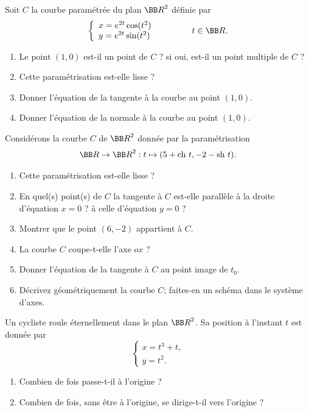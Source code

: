\documentclass[12pt,french,oneside,a4paper]{memoir} %
\begin{document}
\begin{exo}
Soit $C$ la courbe paramétrée du plan ${\BB R}^2$ définie par
\begin{equation*}
\left\{
\begin{array}{l}
x=e^{2t} \cos (t^2) \\
y = e^{2t} \sin (t^2)
\end{array}
\right.
\qquad \qquad t \in {\BB R}.
\end{equation*}
\begin{enumerate}
\item Le point $(1,0)$ est-il un point de $C$ ? si oui, est-il un point
multiple de $C$ ? 
\item Cette paramétrisation est-elle lisse ?
\item Donner l'équation de la tangente à la courbe au point $(1,0)$. 
\item Donner l'équation de la normale à la courbe au point $(1,0)$.
\end{enumerate}
\end{exo}
\begin{exo}
Considérons la courbe $C$ de ${\BB R}^2$ donnée par la paramétrisation
\begin{equation*}
{\BB R} \rightarrow {\BB R}^2 : t \mapsto (5+ \mbox{ch }t,-2- \mbox{sh }t).
\end{equation*}
\begin{enumerate}
\item Cette paramétrisation est-elle lisse ?
\item En quel(s) point(s) de $C$ la tangente à $C$ est-elle parallèle à la
droite d'équation $x=0$ ? à celle d'équation $y=0$ ?
\item Montrer que le point $(6,-2)$ appartient à $C$.
\item La courbe $C$ coupe-t-elle l'axe $ox$ ?
\item Donner l'équation de la tangente à $C$ au point image de $t_0$.
\item Décrivez géométriquement la courbe $C$; faites-en un schéma dans le
système d'axes. 
\end{enumerate}
\end{exo}

\begin{exo}
Un cycliste roule \og éternellement\fg{} \og dans\fg{} le plan ${\BB R}^2$. Sa
position à l'instant $t$ est donnée par
\begin{equation*}
\left\{
\begin{array}{l}
x=t^3+t, \\
y=t^2.
\end{array}
\right.
\end{equation*}
\begin{enumerate}
\item Combien de fois passe-t-il à l'origine ?
\item Combien de fois, sans être à l'origine, se dirige-t-il vers
l'origine ?
\end{enumerate}
\end{exo}
\end{document}

